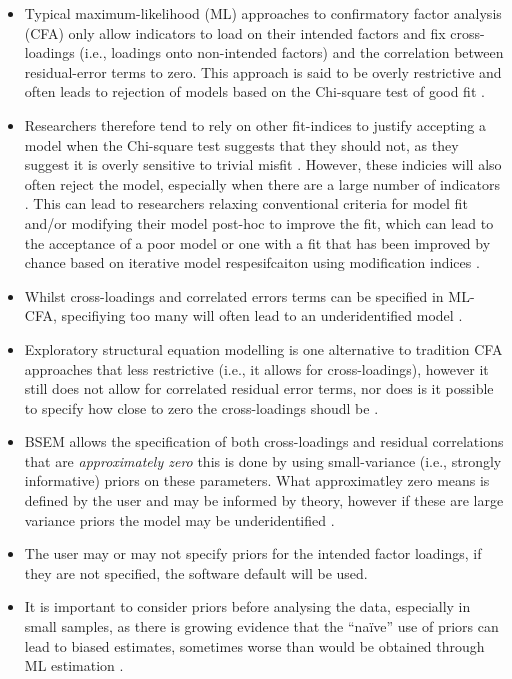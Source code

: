 \documentclass[
  a4paper,
  DIV=11,
  numbers=noendperiod]{scrreprt}
\providecommand{\tightlist}{%
  \setlength{\itemsep}{0pt}\setlength{\parskip}{0pt}}\usepackage{longtable,booktabs,array}
\begin{document}
\begin{itemize}
\tightlist
\item
  Typical maximum-likelihood (ML) approaches to confirmatory factor
  analysis (CFA) only allow indicators to load on their intended factors
  and fix cross-loadings (i.e., loadings onto non-intended factors) and
  the correlation between residual-error terms to zero. This approach is
  said to be overly restrictive and often leads to rejection of models
  based on the Chi-square test of good fit \citep{Marsh2009}.
\item
  Researchers therefore tend to rely on other fit-indices to justify
  accepting a model when the Chi-square test suggests that they should
  not, as they suggest it is overly sensitive to trivial misfit
  \citep{Fong2013}. However, these indicies will also often reject the
  model, especially when there are a large number of indicators
  \citep{Marsh2004}. This can lead to researchers relaxing conventional
  criteria for model fit and/or modifying their model post-hoc to
  improve the fit, which can lead to the acceptance of a poor model or
  one with a fit that has been improved by chance based on iterative
  model respesifcaiton using modification indices \citep{MacCallum1992}.
\item
  Whilst cross-loadings and correlated errors terms can be specified in
  ML-CFA, specifiying too many will often lead to an underidentified
  model \citep{Asparouhov2009}.
\item
  Exploratory structural equation modelling is one alternative to
  tradition CFA approaches that less restrictive (i.e., it allows for
  cross-loadings), however it still does not allow for correlated
  residual error terms, nor does is it possible to specify how close to
  zero the cross-loadings shoudl be \citep{Muthen2012}.
\item
  BSEM allows the specification of both cross-loadings and residual
  correlations that are \emph{approximately zero} this is done by using
  small-variance (i.e., strongly informative) priors on these
  parameters. What approximatley zero means is defined by the user and
  may be informed by theory, however if these are large variance priors
  the model may be underidentified \citep{Muthen2012}.
\item
  The user may or may not specify priors for the intended factor
  loadings, if they are not specified, the software default will be
  used.
\item
  It is important to consider priors before analysing the data,
  especially in small samples, as there is growing evidence that the
  ``naïve'' use of priors can lead to biased estimates, sometimes worse
  than would be obtained through ML estimation \citep{Smid2020}.
\end{itemize}
\end{document}

